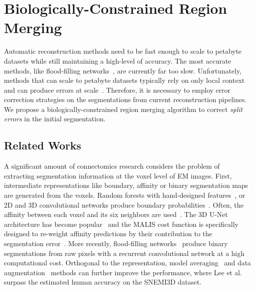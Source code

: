 \section{Biologically-Constrained Region Merging}

Automatic reconstruction methods need to be fast enough to scale to petabyte datasets while still maintaining a high-level of accuracy.
The most accurate methods, like flood-filling networks~\cite{januszewski2016flood}, are currently far too slow.
Unfortunately, methods that can scale to petabyte datasets typically rely on only local context and can produce errors at scale~\cite{haehn2017scalable}. 
Therefore, it is necessary to employ error correction strategies on the segmentations from current reconstruction pipelines.
We propose a biologically-constrained region merging algorithm to correct \textit{split errors} in the initial segmentation.

\subsection{Related Works}

A significant amount of connectomics research considers the problem of extracting segmentation information at the voxel level of EM images.
First, intermediate representations like boundary, affinity or binary segmentation maps are generated from the voxels.
Random forests with hand-designed features~\cite{kaynig2015large}, or 2D and 3D convolutional networks produce boundary probabilities~\cite{bogovic2013learned,ciresan2012deep,jain2010boundary,seymour2016rhoananet,ronneberger2015u,amelio_segmentation}.
Often, the affinity between each voxel and its six neighbors are used~\cite{cciccek20163d,lee2015recursive,lee2017superhuman,parag2017anisotropic,turaga2010convolutional}. 
The 3D U-Net architecture has become popular~\cite{cciccek20163d} and the MALIS cost function is specifically designed to re-weight affinity predictions by their contribution to the segmentation error~\cite{briggman2009maximin}.
More recently, flood-filling networks~\cite{januszewski2016flood} produce binary segmentations from raw pixels with a recurrent convolutional network at a high computational cost.
Orthogonal to the representation, model averaging~\cite{zeng2017deepem3d} and data augmentation~\cite{lee2017superhuman} methods can further improve the performance, where Lee et al.~\cite{lee2017superhuman} surpass the estimated human accuracy on the SNEMI3D dataset.

